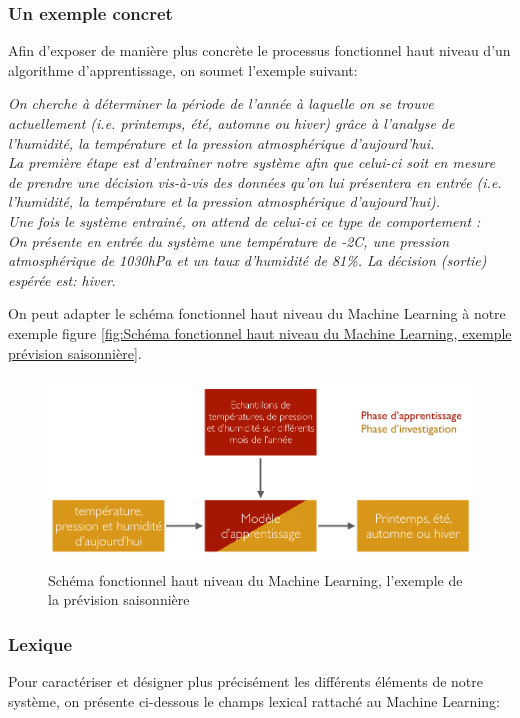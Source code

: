 \subsubsection{Un exemple concret}
\label{Le Machine Learning: Généralités sur le Machine Learning: Définition et principe général:un exemple concret}
Afin d'exposer de manière plus concrète le processus fonctionnel haut niveau d'un algorithme d'apprentissage, on soumet l'exemple suivant:

\textit{On cherche à déterminer la période de l'année à laquelle on se trouve actuellement (i.e. printemps, été, automne ou hiver) grâce à l'analyse de l'humidité, la température et la pression atmosphérique d'aujourd'hui. \\
	La première étape est d'entraîner notre système afin que celui-ci soit en mesure de prendre une décision vis-à-vis des données qu'on lui présentera en entrée (i.e. l'humidité, la température et la pression atmosphérique d'aujourd'hui). \\
	Une fois le système entrainé, on attend de celui-ci ce type de comportement : \\
	On présente en entrée du système une température de -2\degres C, une pression atmosphérique de 1030hPa et un taux d'humidité de 81\%. La décision (sortie) espérée est: \emph{hiver}}.

On peut adapter le schéma fonctionnel haut niveau du Machine Learning à notre exemple figure \ref{fig:Schéma fonctionnel haut niveau du Machine Learning, exemple prévision saisonnière}. 

\begin{figure}[h]
	\centering\includegraphics[height=5cm]{images/ML_high_level_expl.png}
	\caption{Schéma fonctionnel haut niveau du Machine Learning, l'exemple de la prévision saisonnière}
	\label{fig:Schéma fonctionnel haut niveau du Machine Learning, l'exemple prévision saisonnière}
\end{figure}

\subsubsection{Lexique} 
\label{Le Machine Learning: Généralités sur le Machine Learning: Définition et principe général:Lexique}
Pour caractériser et  désigner plus précisément les différents éléments de notre système, on présente ci-dessous le champs lexical rattaché au Machine Learning:


